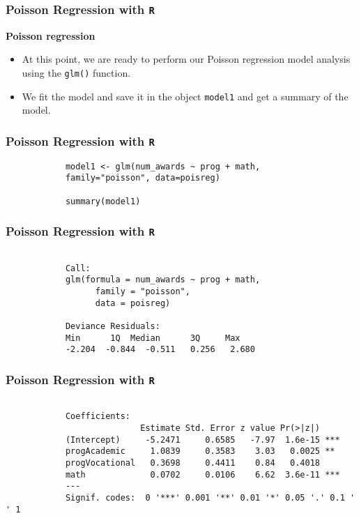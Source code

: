 \documentclass[MASTER.tex]{subfiles}
\begin{document}
	
\begin{frame}[fragile]
		
		\frametitle{Poisson Regression with \texttt{R}}
		\Large
		
		\textbf{Poisson regression}
		\begin{itemize}
			\item At this point, we are ready to perform our Poisson regression model analysis using the \texttt{glm()} function. 
			\item We fit the model and save it in the object \texttt{model1} and get a summary of the model.
		\end{itemize}
\end{frame}
	
	\begin{frame}[fragile]
		
		\frametitle{Poisson Regression with \texttt{R}}
		\Large
		\begin{framed}
			\begin{verbatim}
			model1 <- glm(num_awards ~ prog + math, 
			family="poisson", data=poisreg)
			
			summary(model1)
			\end{verbatim}
		\end{framed}
\end{frame}
	\begin{frame}[fragile]
		\frametitle{Poisson Regression with \texttt{R}}
	\large
\begin{framed}
\begin{verbatim}
			
			Call:
			glm(formula = num_awards ~ prog + math, 
			      family = "poisson", 
			      data = poisreg)
			               
			Deviance Residuals: 
			Min      1Q  Median      3Q     Max  
			-2.204  -0.844  -0.511   0.256   2.680  
			\end{verbatim}
		\end{framed}
\end{frame}
\begin{frame}[fragile]
		
		\frametitle{Poisson Regression with \texttt{R}}

			\begin{verbatim}
			
			Coefficients:
			               Estimate Std. Error z value Pr(>|z|)    
			(Intercept)     -5.2471     0.6585   -7.97  1.6e-15 ***
			progAcademic     1.0839     0.3583    3.03   0.0025 ** 
			progVocational   0.3698     0.4411    0.84   0.4018    
			math             0.0702     0.0106    6.62  3.6e-11 ***
			---
			Signif. codes:  0 '***' 0.001 '**' 0.01 '*' 0.05 '.' 0.1 ' ' 1
			
			\end{verbatim}
		
\end{frame}
\end{document}
